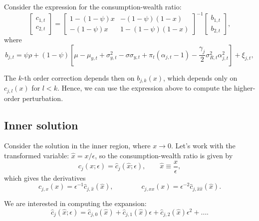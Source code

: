\documentclass[11pt,english]{article}
\begin{document}
Consider the expression for the consumption-wealth ratio:
\begin{equation}
    \left[ 
        \begin{matrix}
            c_{1,t}\\
            c_{2,t}
        \end{matrix}
    \right]= \left[ 
        \begin{matrix}
            1 - (1-\psi) x & - (1-\psi) (1-x) \\
            - (1-\psi) x & 1 - (1-\psi) (1-x)
        \end{matrix}
    \right]^{-1} \left[ 
        \begin{matrix}
            b_{1,t}\\
            b_{2,t}
        \end{matrix}
     \right],
\end{equation}
where 
\begin{equation}
    b_{j,t} = \psi \rho + (1-\psi) \left[ \mu - \mu_{y,t} +\sigma_{y,t}^2 - \sigma \sigma_{y,t} + \pi_t (\alpha_{j,t}-1) - \frac{\gamma_j}{2} \sigma_{R,t}^2 \alpha_{j,t}^2 \right] + \xi_{j,t},
\end{equation}

The $k$-th order correction depends then on $b_{j,k}(x)$, which depends only on $c_{j,l}(x)$ for $l < k$. Hence, we can use the expression above to compute the higher-order perturbation. 

\subsection{Inner solution}

Consider the solution in the inner region, where $x \to 0$. Let's work with the transformed variable: $\hat{x} = x / \epsilon$, so the consumption-wealth ratio is given by 
\begin{equation}
    c_{j}(x;\epsilon) = \hat{c}_j(\hat{x};\epsilon), \qquad \hat{x} \equiv \frac{x}{\epsilon},
\end{equation}
which gives the derivatives
\begin{equation}
    c_{j,x}(x) = \epsilon^{-1} \hat{c}_{j,\hat{x}}(\hat{x}), \qquad \qquad 
    c_{j,xx}(x) = \epsilon^{-2} \hat{c}_{j,\hat{x}\hat{x}}(\hat{x}).
\end{equation}

We are interested in computing the expansion:
\begin{equation}
    \hat{c}_{j}(\hat{x};\epsilon) = \hat{c}_{j,0}(\hat{x}) +\hat{c}_{j,1}(\hat{x}) \epsilon + \hat{c}_{j,2}(\hat{x}) \epsilon^2 +\ldots.
\end{equation}
\end{document}
